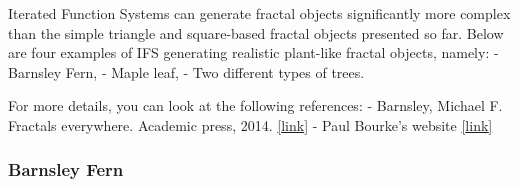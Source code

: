 \documentclass[11pt]{article}
\begin{document}
Iterated Function Systems can generate fractal objects significantly
more complex than the simple triangle and square-based fractal objects
presented so far. Below are four examples of IFS generating realistic
plant-like fractal objects, namely: - Barnsley Fern, - Maple leaf, - Two
different types of trees.

For more details, you can look at the following references: - Barnsley,
Michael F. Fractals everywhere. Academic press, 2014.
\href{https://books.google.fr/books/about/Fractals_Everywhere.html?id=PbMAAQAAQBAJ\&printsec=frontcover\&source=kp_read_button\&redir_esc=y\#v=onepage\&q\&f=false}{{[}link{]}}
- Paul Bourke's website
\href{http://paulbourke.net/fractals/}{{[}link{]}}

\hypertarget{barnsley-fern}{%
\subsubsection{Barnsley Fern}\label{barnsley-fern}}
\end{document}
